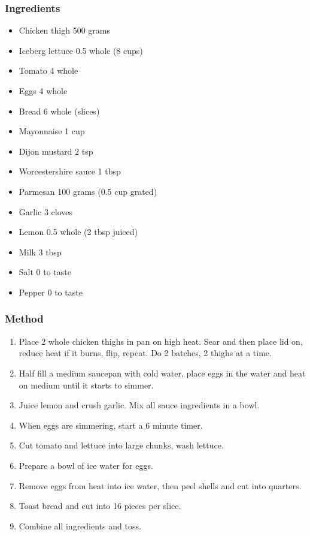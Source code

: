 \documentclass[]{article}
\begin{document}
\subsubsection*{\Large Ingredients}
\begin{multicols}{2}
\begin{itemize}
 \item Chicken thigh \hfill 500 grams
 \item Iceberg lettuce \hfill 0.5 whole (8 cups)
 \item Tomato \hfill 4 whole
 \item Eggs \hfill 4 whole
 \item Bread \hfill 6 whole (slices)
 \item Mayonnaise \hfill 1 cup
 \item Dijon mustard \hfill 2 tsp
 \item Worcestershire sauce \hfill 1 tbsp
 \item Parmesan \hfill 100 grams (0.5 cup grated)
 \item Garlic \hfill 3 cloves
 \item Lemon \hfill 0.5 whole (2 tbsp juiced)
 \item Milk \hfill 3 tbsp
 \item Salt \hfill 0 to taste
 \item Pepper \hfill 0 to taste
\end{itemize}
\end{multicols}
\subsubsection*{\Large Method}
\begin{enumerate}[font=\huge\color{accent}]
	\item Place 2 whole chicken thighs in pan on high heat. Sear and then place lid on, reduce heat if it burns, flip, repeat. Do 2 batches, 2 thighs at a time.
	\item Half fill a medium saucepan with cold water, place eggs in the water and heat on medium until it starts to simmer.
	\item Juice lemon and crush garlic. Mix all sauce ingredients in a bowl.
	\item When eggs are simmering, start a 6 minute timer.
	\item Cut tomato and lettuce into large chunks, wash lettuce.
	\item Prepare a bowl of ice water for eggs.
	\item Remove eggs from heat into ice water, then peel shells and cut into quarters.
	\item Toast bread and cut into 16 pieces per slice.
	\item Combine all ingredients and toss.
\end{enumerate}
\newpage
{}\label{rec:Chicken Fatteh}
\end{document}
